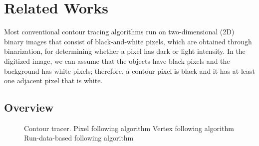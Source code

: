 
\section{Related Works}

Most conventional contour tracing algorithms run on two-dimensional (2D) binary images that consist of black-and-white pixels, which are obtained through binarization, for determining whether a pixel has dark or light intensity. In the digitized image, we can assume that the objects have black pixels and the background has white pixels; therefore, a contour pixel is black and it has at least one adjacent pixel that is white.

\subsection{Overview}

\begin{figure}[htbp]
	\centering
	 
	\caption{Contour tracer. \protect{} Pixel following algorithm \protect{} Vertex following algorithm \protect{} Run-data-based following algorithm}
	\label{fig:image1}
\end{figure}

